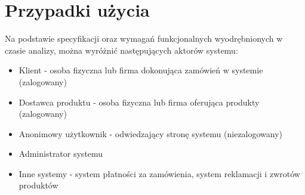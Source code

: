 \documentclass[11pt,a4paper,twoside]{article}
\begin{document}
\section{Przypadki użycia}
Na podstawie specyfikacji oraz wymagań funkcjonalnych wyodrębnionych w czasie analizy, można wyróżnić następujących aktorów systemu:
\begin{itemize}[label={--}]
\item Klient - osoba fizyczna lub firma dokonująca zamówień w systemie (zalogowany)
\item Dostawca produktu - osoba fizyczna lub firma oferująca produkty (zalogowany)
\item Anonimowy użytkownik - odwiedzający stronę systemu (niezalogowany)
\item Administrator systemu
\item Inne systemy - system płatności za zamówienia, system reklamacji i zwrotów produktów
\end{itemize}
\end{document}
